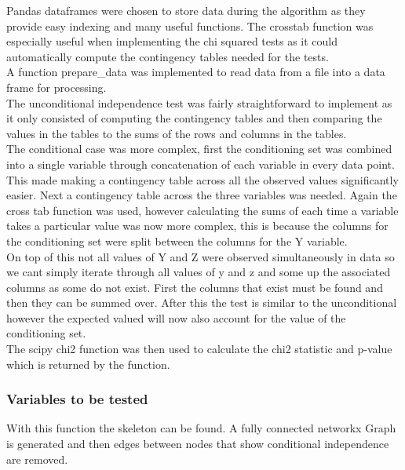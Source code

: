 \documentclass{article}
\begin{document}
Pandas dataframes were chosen to store data during the algorithm as they provide easy indexing and many useful functions. The crosstab function was especially useful when implementing the chi squared tests as it could automatically compute the contingency tables needed for the tests.
\\

A function prepare\_data was implemented to read data from a file into a data frame for processing.\\

The unconditional independence test was fairly straightforward to implement as it only consisted of computing the contingency tables and then comparing the values in the tables to the sums of the rows and columns in the tables.\\

The conditional case was more complex, first the conditioning set was combined into a single variable through concatenation of each variable in every data point. This made making a contingency table across all the observed values significantly easier. Next a contingency table across the three variables was needed. Again the cross tab function was used, however calculating the sums of each time a variable takes a particular value was now more complex, this is because the columns for the conditioning set were split between the columns for the Y variable.\\

On top of this not all values of Y and Z were observed simultaneously in data so
we cant simply iterate through all values of y and z and some up the associated columns as some do not exist. First the columns that exist must be found and then they can be summed over. After this the test is similar to the unconditional however the expected valued will now also account for the value of the conditioning set.
\\

The scipy chi2 function was then used to calculate the chi2 statistic and p-value which is returned by the function.\\

\subsubsection{Variables to be tested}
With this function the skeleton can be found. A fully connected networkx Graph is generated and then edges between nodes that show conditional independence are removed. 
\end{document}
